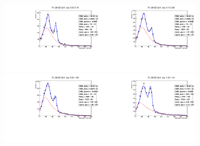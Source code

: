 \begin{figure}[htb]
  \begin{center}
   \includegraphics[width=0.45\textwidth]{../figs/figs_v11/ELECTRON_WGamma/EtoGammaFits/sa_hZmass_h_Data_EtoGamma_Enr_BARREL_pt20to25_ieta0_noWMtCut.pdf}\includegraphics[width=0.45\textwidth]{../figs/figs_v11/ELECTRON_WGamma/EtoGammaFits/sa_hZmass_h_Data_EtoGamma_Enr_BARREL_pt20to25_ieta1_noWMtCut.pdf}\\
   \includegraphics[width=0.45\textwidth]{../figs/figs_v11/ELECTRON_WGamma/EtoGammaFits/sa_hZmass_h_Data_EtoGamma_Enr_BARREL_pt20to25_ieta2_noWMtCut.pdf}\includegraphics[width=0.45\textwidth]{../figs/figs_v11/ELECTRON_WGamma/EtoGammaFits/sa_hZmass_h_Data_EtoGamma_Enr_BARREL_pt20to25_ieta3_noWMtCut.pdf}\\

\end{center}
\end{figure}

